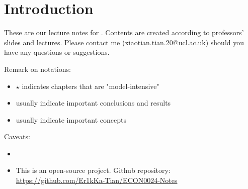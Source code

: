 \chapter*{Introduction}
These are our  lecture notes for . Contents are created according to professors' slides and lectures. Please contact me  (xiaotian.tian.20@ucl.ac.uk) should you have any questions or suggestions.

Remark on notations:
\begin{itemize}
    \item $\star$ indicates chapters that are "model-intensive"
    \item {} usually indicate important conclusions and results
    \item {} usually indicate important concepts
\end{itemize}

Caveats:
\begin{itemize}
    \item {}
    \item This is an open-source project. Github repository: \hyperlink{https://github.com/Er1kKa-Tian/ECON0024-Notes}{https://github.com/Er1kKa-Tian/ECON0024-Notes}
\end{itemize}



\iffalse
    \begin{figure}[H]
        \centering
        \texttt{[image: images/102115356\_p0.jpg]}
        \caption{Enjoy this lovely picture before we start!}
        \label{fig:Introduction}
    \end{figure}
\fi